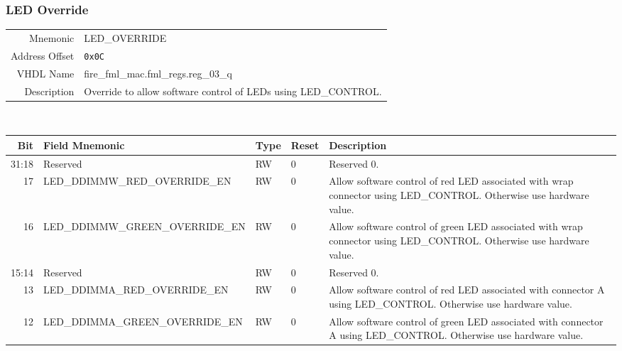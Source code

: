 \subsubsection{LED Override}
\begin{tabular}{ r | p{350px} }
  Mnemonic       & LED\_OVERRIDE                       \\
  Address Offset & \texttt{0x0C}                       \\
  VHDL Name      & fire\_fml\_mac.fml\_regs.reg\_03\_q \\ \hline

  Description &
  Override to allow software control of LEDs using LED\_CONTROL. \\
\end{tabular}
\\
\begin{tabularx}{\textwidth}{r|l|l|l|X}
  \hline
  Bit   & Field Mnemonic                   & Type & Reset & Description \\ \hline

  31:18 & Reserved                         & RW   & 0     &

  Reserved 0. \\

  17    & LED\_DDIMMW\_RED\_OVERRIDE\_EN   & RW   & 0     &

  Allow software control of red LED associated with wrap connector using LED\_CONTROL. Otherwise use hardware value. \\

  16    & LED\_DDIMMW\_GREEN\_OVERRIDE\_EN & RW   & 0     &

  Allow software control of green LED associated with wrap connector using LED\_CONTROL. Otherwise use hardware value. \\

  15:14 & Reserved                         & RW   & 0     &

  Reserved 0. \\

  13    & LED\_DDIMMA\_RED\_OVERRIDE\_EN   & RW   & 0     &

  Allow software control of red LED associated with connector A using LED\_CONTROL. Otherwise use hardware value. \\

  12    & LED\_DDIMMA\_GREEN\_OVERRIDE\_EN & RW   & 0     &

  Allow software control of green LED associated with connector A using LED\_CONTROL. Otherwise use hardware value. \\


\end{tabularx}
